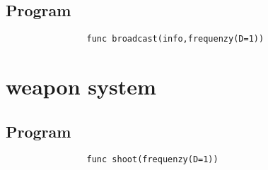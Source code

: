 \documentclass[a4paper]{scrreprt}
\begin{document}
        \subsection{Program}
            \begin{verbatim}
                func broadcast(info,frequenzy(D=1))
            \end{verbatim}
    \section{weapon system}
        \subsection{Program}
            \begin{verbatim}
                func shoot(frequenzy(D=1))
            \end{verbatim}
        
\end{document}
